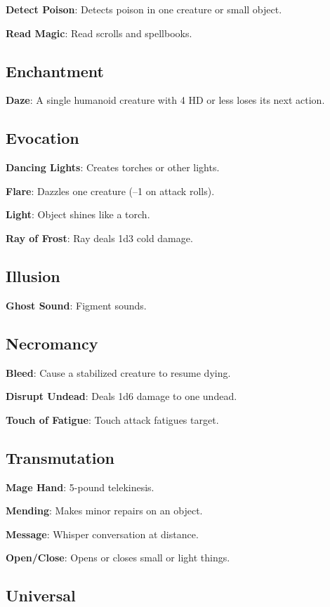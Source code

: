 \textbf{Detect Poison}: Detects poison in one creature or small object.

\textbf{Read Magic}: Read scrolls and spellbooks.

\subsection{Enchantment}


\textbf{Daze}: A single humanoid creature with 4 HD or less loses its next action.

\subsection{Evocation}


\textbf{Dancing Lights}: Creates torches or other lights.

\textbf{Flare}: Dazzles one creature (--1 on attack rolls).

\textbf{Light}: Object shines like a torch.

\textbf{Ray of Frost}: Ray deals 1d3 cold damage.

\subsection{Illusion}


\textbf{Ghost Sound}: Figment sounds.

\subsection{Necromancy}


\textbf{Bleed}: Cause a stabilized creature to resume dying.

\textbf{Disrupt Undead}: Deals 1d6 damage to one undead.

\textbf{Touch of Fatigue}: Touch attack fatigues target.

\subsection{Transmutation}


\textbf{Mage Hand}: 5-pound telekinesis.

\textbf{Mending}: Makes minor repairs on an object.

\textbf{Message}: Whisper conversation at distance.

\textbf{Open/Close}: Opens or closes small or light things.

\subsection{Universal}


